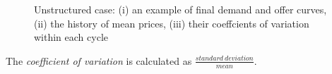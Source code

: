 \documentclass[12pt]{report}
\begin{document}
\begin{figure}[htbp]
\begin{center}
\caption{Unstructured case: (i) an example of final demand and offer curves, (ii) the history of mean prices, (iii) their coeffcients of variation within each cycle}
\label{output_4_1.png}
\end{center}
\end{figure}

The \emph{coefficient of variation} is calculated as $\frac{standard~deviation}{mean}$.
\end{document}
